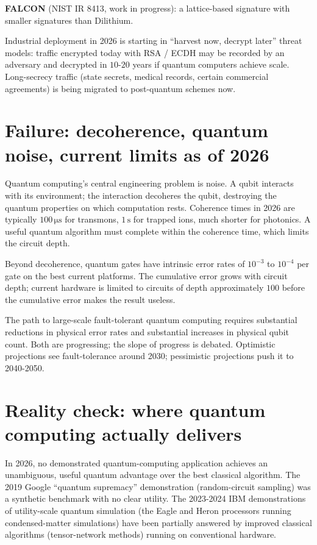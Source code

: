 \textbf{FALCON} (NIST IR 8413, work in progress): a lattice-based signature with smaller signatures than Dilithium.

Industrial deployment in 2026 is starting in ``harvest now, decrypt later'' threat models: traffic encrypted today with RSA / ECDH may be recorded by an adversary and decrypted in $10$-$20$ years if quantum computers achieve scale. Long-secrecy traffic (state secrets, medical records, certain commercial agreements) is being migrated to post-quantum schemes now.

\section{Failure: decoherence, quantum noise, current limits as of 2026}

Quantum computing's central engineering problem is noise. A qubit interacts with its environment; the interaction decoheres the qubit, destroying the quantum properties on which computation rests. Coherence times in 2026 are typically $100\,\si{\micro\second}$ for transmons, $1\,\si{\second}$ for trapped ions, much shorter for photonics. A useful quantum algorithm must complete within the coherence time, which limits the circuit depth.

Beyond decoherence, quantum gates have intrinsic error rates of $10^{-3}$ to $10^{-4}$ per gate on the best current platforms. The cumulative error grows with circuit depth; current hardware is limited to circuits of depth approximately $100$ before the cumulative error makes the result useless.

The path to large-scale fault-tolerant quantum computing requires substantial reductions in physical error rates and substantial increases in physical qubit count. Both are progressing; the slope of progress is debated. Optimistic projections see fault-tolerance around 2030; pessimistic projections push it to 2040-2050.

\section{Reality check: where quantum computing actually delivers}

In 2026, no demonstrated quantum-computing application achieves an unambiguous, useful quantum advantage over the best classical algorithm. The 2019 Google ``quantum supremacy'' demonstration (random-circuit sampling) was a synthetic benchmark with no clear utility. The 2023-2024 IBM demonstrations of utility-scale quantum simulation (the Eagle and Heron processors running condensed-matter simulations) have been partially answered by improved classical algorithms (tensor-network methods) running on conventional hardware.

